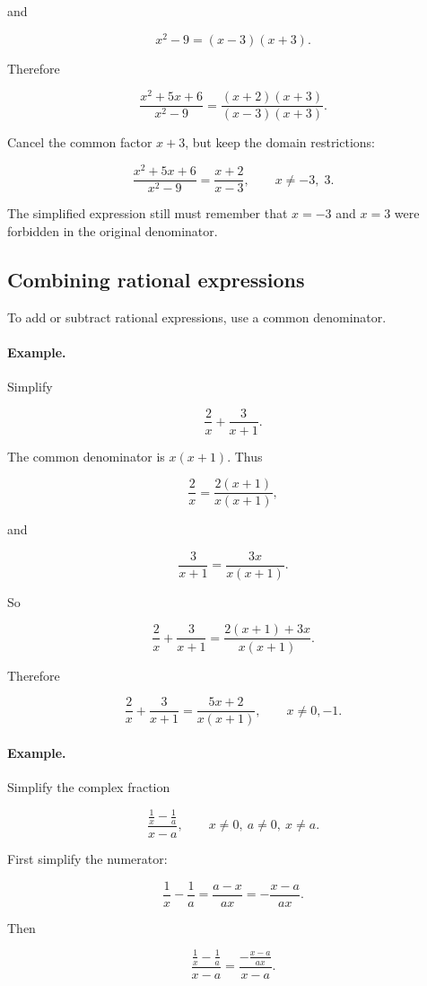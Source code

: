 and

\[
x^2-9=(x-3)(x+3).
\]

Therefore

\[
\frac{x^2+5x+6}{x^2-9}
=
\frac{(x+2)(x+3)}{(x-3)(x+3)}.
\]

Cancel the common factor \(x+3\), but keep the domain restrictions:

\[
\boxed{
\frac{x^2+5x+6}{x^2-9}
=
\frac{x+2}{x-3},
\qquad x\neq -3,\;3.
}
\]

The simplified expression still must remember that \(x=-3\) and \(x=3\) were forbidden
in the original denominator.

\subsection{Combining rational expressions}
\label{appsubsec:combining-rational-expressions}

To add or subtract rational expressions, use a common denominator.

\paragraph{Example.}
Simplify

\[
\frac{2}{x}+\frac{3}{x+1}.
\]

The common denominator is \(x(x+1)\).  Thus

\[
\frac{2}{x}
=
\frac{2(x+1)}{x(x+1)},
\]

and

\[
\frac{3}{x+1}
=
\frac{3x}{x(x+1)}.
\]

So

\[
\frac{2}{x}+\frac{3}{x+1}
=
\frac{2(x+1)+3x}{x(x+1)}.
\]

Therefore

\[
\boxed{
\frac{2}{x}+\frac{3}{x+1}
=
\frac{5x+2}{x(x+1)},
\qquad x\neq0,-1.
}
\]

\paragraph{Example.}
Simplify the complex fraction

\[
\frac{\frac1x-\frac1a}{x-a},
\qquad x\neq0,\ a\neq0,\ x\neq a.
\]

First simplify the numerator:

\[
\frac1x-\frac1a
=
\frac{a-x}{ax}
=
-\frac{x-a}{ax}.
\]

Then

\[
\frac{\frac1x-\frac1a}{x-a}
=
\frac{-\frac{x-a}{ax}}{x-a}.
\]

